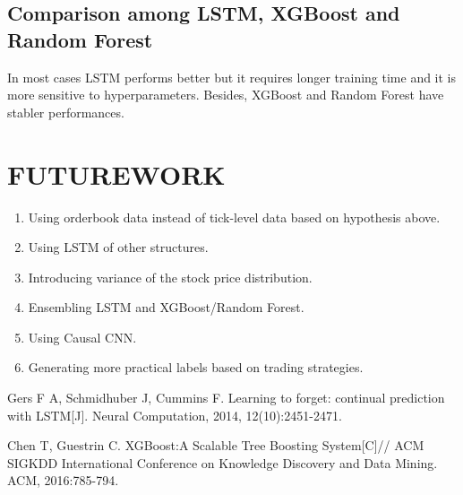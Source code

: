 \documentclass[10pt, conference, compsocconf]{IEEEtran}
\begin{document}
\subsection{Comparison among LSTM, XGBoost and Random Forest}
In most cases LSTM performs better but it requires longer training time and it is more sensitive to hyperparameters. Besides, XGBoost and
Random Forest have stabler performances.

\section{FUTUREWORK}
\begin{enumerate}
	\item Using orderbook data instead of tick-level data based on hypothesis above.
	\item Using LSTM of other structures.
	\item Introducing variance of the stock price distribution.
	\item Ensembling LSTM and XGBoost/Random Forest.
	\item Using Causal CNN.
	\item Generating more practical labels based on trading strategies.
\end{enumerate}

\vspace{0.5cm}

\begin{thebibliography}{1}
Gers F A, Schmidhuber J, Cummins F. Learning to forget: continual prediction with LSTM[J]. Neural Computation, 2014, 12(10):2451-2471.\label{ref 1}

Chen T, Guestrin C. XGBoost:A Scalable Tree Boosting System[C]// ACM SIGKDD International Conference on Knowledge Discovery and Data Mining. ACM, 2016:785-794.\label{ref 2}

\end{thebibliography}
\end{document}

